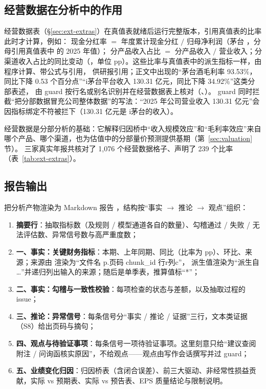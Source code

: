 \subsection{经营数据在分析中的作用}
\label{sec:an-extras}

经营数据表（\S\ref{sec:ext-extras}）在真值表就绪后运行完整版本，引用真值表的比率此时才计算，例如：
现金分红率 $=$ 年度累计现金分红 $/$ 归母净利润（茅台 ，分母引用真值表中  的 2025 年值）；
分产品收入占比 $=$ 分产品收入 $/$ 营业收入；分渠道收入占比的同比变动（，单位 pp）。这些比率与真值表中的派生指标一样，由程序计算、带公式与引用，
供研报引用；正文中出现的“茅台酒毛利率 93.53\%，同比下降 0.53 个百分点”“i茅台平台收入 130.31 亿元，同比下降 34.92\%”这类分部表述，
由 guard 按行名或别名识别并在经营数据表上核对（、）。
guard 同时拦截“把分部数据冒充公司整体数据”的写法：“2025 年公司营业收入 130.31 亿元”会因指标绑定不符被拦下（130.31 亿元是 i茅台的收入）。

经营数据是分部分析的基础：它解释归因桥中“收入规模效应”和“毛利率效应”来自哪个产品、哪个渠道，也为估值中的分部量价预测提供基期（第~\ref{sec:valuation} 节）。
三家真实年报共核对了 1,076 个经营数据格子、声明了 239 个比率（表~\ref{tab:ext-extras}）。

\subsection{报告输出}
\label{sec:an-report}

 把分析产物渲染为 Markdown 报告 ，结构按“事实 $\to$ 推论 $\to$ 观点”组织：

\begin{enumerate}
\item \textbf{摘要行}：抽取指标数（及规则 / 模型通道各自的数量）、勾稽通过 / 失败 / 无法评估数、异常信号数与高严重度数；
\item \textbf{一、事实：关键财务指标}：本期、上年同期、同比（比率为 pp）、环比、来源；来源由  渲染为“文件名 p.页码 chunk\_id 行r列c”，
      派生值渲染为“派生自 …”并递归列出输入的来源；随后是单季表，推算值标“*”；
\item \textbf{二、事实：勾稽与一致性校验}：每项检查的状态与差额，以及抽取过程的 issue；
\item \textbf{三、推论：异常信号}：每条信号分“事实 / 推论 / 证据”三行，文本类证据（S8）给出页码与摘句；
\item \textbf{四、观点与待验证事项}：每条信号一项待验证事项。这里刻意只给“建议查阅附注 / 问询函核实原因”，不给观点——观点由写作会话撰写并过 guard；
\item \textbf{五、业绩变化归因}：归因桥表（含闭合误差）、前三大驱动、非经常性损益贡献，实际 vs 预期表、实际 vs 预告表、EPS 质量结论与限制说明。
\end{enumerate}

